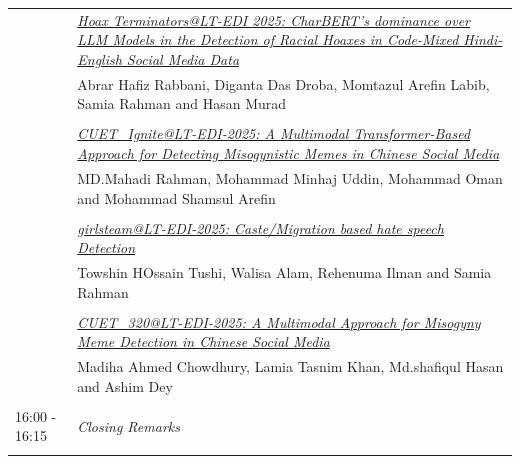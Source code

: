 \documentclass[11pt,oneside]{book}
\begin{document}
\begin{tabular}{p{24mm}p{124mm}}
                      & \hyperlink{page.159}{\emph{Hoax Terminators@LT-EDI 2025: CharBERT's dominance over LLM Models in the Detection of Racial Hoaxes in Code-Mixed Hindi-English Social Media Data}}\\
        & Abrar Hafiz Rabbani\index{Rabbani}, Diganta Das Droba\index{Droba}, Momtazul Arefin Labib\index{Labib}, Samia Rahman\index{Rahman} and Hasan Murad\index{Murad}\\\\
                
                      & \hyperlink{page.171}{\emph{CUET\_Ignite@LT-EDI-2025: A Multimodal Transformer-Based Approach for Detecting Misogynistic Memes in Chinese Social Media}}\\
        & MD.Mahadi Rahman\index{Rahman}, Mohammad Minhaj Uddin\index{Uddin}, Mohammad Oman\index{Oman} and Mohammad Shamsul Arefin\index{Arefin}\\\\
                
                      & \hyperlink{page.177}{\emph{girlsteam@LT-EDI-2025: Caste/Migration based hate speech Detection}}\\
        & Towshin HOssain Tushi\index{Tushi}, Walisa Alam\index{Alam}, Rehenuma Ilman\index{Ilman} and Samia Rahman\index{Rahman}\\\\
                
                      & \hyperlink{page.183}{\emph{CUET\_320@LT-EDI-2025: A Multimodal Approach for Misogyny Meme Detection in Chinese Social Media}}\\
        & Madiha Ahmed Chowdhury\index{Chowdhury}, Lamia Tasnim Khan\index{Khan}, Md.shafiqul Hasan\index{Hasan} and Ashim Dey\index{Dey}\\\\
                        16:00 - 16:15 & \emph{Closing Remarks}\\\\
      
              \end{tabular}
    \newpage
      
\end{document}
